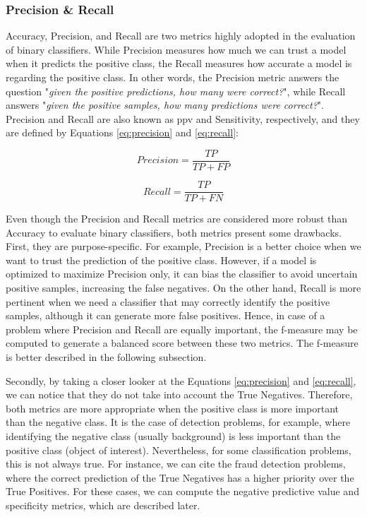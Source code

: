 \subsubsection{Precision \& Recall} \label{precision-recall}

Accuracy, Precision, and Recall are two metrics highly adopted in the evaluation of binary classifiers. While Precision measures how much we can trust a model when it predicts the positive class, the Recall measures how accurate a model is regarding the positive class. In other words, the Precision metric answers the question "\textit{given the positive predictions, how many were correct?}", while Recall answers "\textit{given the positive samples, how many predictions were correct?}". Precision and Recall are also known as \acf{ppv} and Sensitivity, respectively, and they are defined by Equations \ref{eq:precision} and \ref{eq:recall}: 

\begin{equation}
\label{eq:precision}
Precision = \frac{TP}{TP + FP}
\end{equation}

\begin{equation}
\label{eq:recall}
Recall = \frac{TP}{TP + FN}
\end{equation}

Even though the Precision and Recall metrics are considered more robust than Accuracy to evaluate binary classifiers, both metrics present some drawbacks. First, they are purpose-specific. For example, Precision is a better choice when we want to trust the prediction of the positive class. However, if a model is optimized to maximize Precision only, it can bias the classifier to avoid uncertain positive samples, increasing the false negatives. On the other hand, Recall is more pertinent when we need a classifier that may correctly identify the positive samples, although it can generate more false positives. Hence, in case of a problem where Precision and Recall are equally important, the f-measure may be computed to generate a balanced score between these two metrics. The f-measure is better described in the following subsection.

Secondly, by taking a closer looker at the Equations \ref{eq:precision} and \ref{eq:recall}, we can notice that they do not take into account the True Negatives. Therefore, both metrics are more appropriate when the positive class is more important than the negative class. It is the case of detection problems, for example, where identifying the negative class (usually background) is less important than the positive class (object of interest). Nevertheless, for some classification problems, this is not always true. For instance, we can cite the fraud detection problems, where the correct prediction of the True Negatives has a higher priority over the True Positives. For these cases, we can compute the negative predictive value and specificity metrics, which are described later.


